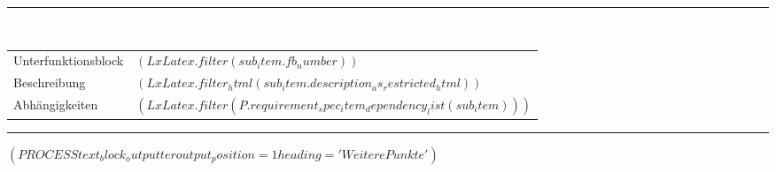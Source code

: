 \documentclass{scrartcl}
\begin{document}
\hspace*{1.15cm}\rule{15.2cm}{0.2pt}\\
\hspace*{1.0cm}%
\parbox[t]{15.0cm}{%
\begin{longtable}{p{2.8cm}p{11.7cm}}
  Unterfunktionsblock & $( LxLatex.filter(sub_item.fb_number) )$\\
  Beschreibung & $( LxLatex.filter_html(sub_item.description_as_restricted_html) )$\\
  Abhängigkeiten & $( LxLatex.filter(P.requirement_spec_item_dependency_list(sub_item)) )$
\end{longtable}}


\vspace{0.2cm}
\hrule
\vspace{0.4cm}


%

$( PROCESS text_block_outputter output_position=1 heading='Weitere Punkte' )$
\end{document}
